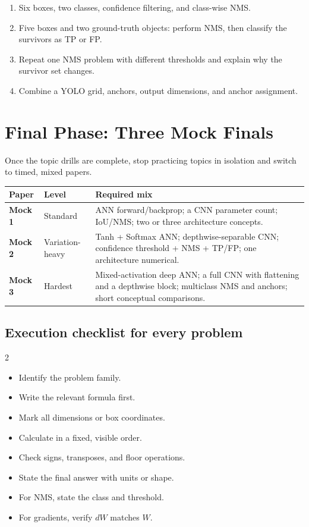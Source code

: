 \documentclass[11pt]{article}
\newcommand{\checkbox}{\(\square\)}
\begin{document}
\begin{enumerate}[label=\textbf{Challenge \arabic*:},leftmargin=*,align=left,nosep]
  \item Six boxes, two classes, confidence filtering, and class-wise NMS.
  \item Five boxes and two ground-truth objects: perform NMS, then classify the survivors as TP or FP.
  \item Repeat one NMS problem with different thresholds and explain why the survivor set changes.
  \item Combine a YOLO grid, anchors, output dimensions, and anchor assignment.
\end{enumerate}

\section{Final Phase: Three Mock Finals}

Once the topic drills are complete, stop practicing topics in isolation and switch to timed, mixed papers.

\begin{center}
\small
\begin{tabularx}{\textwidth}{>{\bfseries}p{2.4cm} p{2.8cm} X}
\toprule
Paper & Level & Required mix \\
\midrule
Mock 1 & Standard & ANN forward/backprop; a CNN parameter count; IoU/NMS; two or three architecture concepts. \\
Mock 2 & Variation-heavy & Tanh + Softmax ANN; depthwise-separable CNN; confidence threshold + NMS + TP/FP; one architecture numerical. \\
Mock 3 & Hardest & Mixed-activation deep ANN; a full CNN with flattening and a depthwise block; multiclass NMS and anchors; short conceptual comparisons. \\
\bottomrule
\end{tabularx}
\end{center}

\subsection{Execution checklist for every problem}

\begin{multicols}{2}
\begin{itemize}[label=\checkbox,nosep]
  \item Identify the problem family.
  \item Write the relevant formula first.
  \item Mark all dimensions or box coordinates.
  \item Calculate in a fixed, visible order.
  \item Check signs, transposes, and floor operations.
  \item State the final answer with units or shape.
  \item For NMS, state the class and threshold.
  \item For gradients, verify \(dW\) matches \(W\).
\end{itemize}
\end{multicols}
\end{document}
